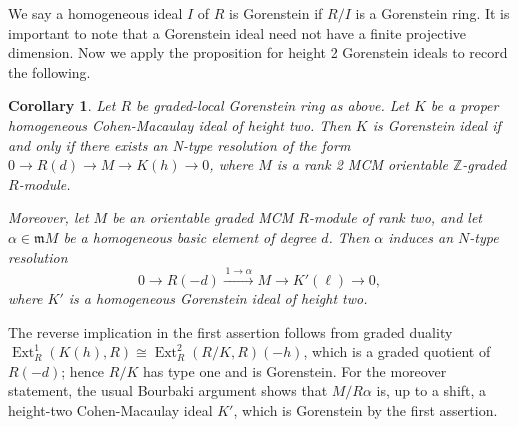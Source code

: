 \documentclass[11pt,letterpaper]{amsart}
\newcommand{\x}{\xrightarrow{}}
\DeclareMathOperator{\Ext}{Ext}
\theoremstyle{plain}
\newtheorem{cor}[thm]{Corollary}
\theoremstyle{definition}
\theoremstyle{remark}
\begin{document}

We say a homogeneous ideal $I$ of $R$ is Gorenstein if $R/I$ is a Gorenstein ring. It is important to note that a Gorenstein ideal need not have a finite projective dimension. Now we apply the proposition for height 2 Gorenstein ideals to record the following.

\begin{cor}\label{rank2Gorenstein}
    Let $R$ be graded-local Gorenstein ring as above. Let $K$ be a proper homogeneous Cohen-Macaulay ideal of height two. Then $K$ is Gorenstein ideal if and only if there exists an N-type resolution of the form  $0\x R(d)\x M\x K(h)\x 0$, where $M$ is a rank 2 MCM orientable $\mathbb Z$-graded $R$-module. 

    Moreover, let \(M\) be an orientable graded MCM \(R\)-module of rank two,
and let \(\alpha\in \mathfrak mM\) be a homogeneous basic element of degree \(d\).
Then \(\alpha\) induces an \(N\)-type resolution
\[
0\longrightarrow R(-d)\xrightarrow{\,1\x\alpha\,}
M\longrightarrow K'(\ell)\longrightarrow 0,
\]
where \(K'\) is a homogeneous Gorenstein ideal of height two.
\end{cor}

The reverse implication in the first assertion follows from graded duality $\Ext_R^1(K(h),R)\cong \Ext_R^2(R/K,R)(-h)$, which is a graded quotient of \(R(-d)\); hence \(R/K\) has type one and is
Gorenstein. For the moreover statement, the usual Bourbaki argument shows
that \(M/R\alpha\) is, up to a shift, a height-two Cohen-Macaulay ideal
\(K'\), which is Gorenstein by the first assertion.
\end{document}
